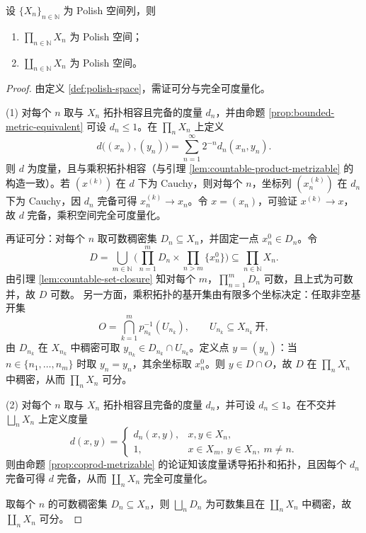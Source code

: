 \documentclass[lang=cn,a4paper,newtx,figureplace=section,tableplace=section]{elegantbook}
\begin{document}
\begin{theorem}\label{thm:polish-product-sum}
  设 $\{X_n\}_{n\in\mathbb N}$ 为 Polish 空间列，则
  \begin{enumerate}
    \item $\prod_{n\in\mathbb N}X_n$ 为 Polish 空间；
    \item $\coprod_{n\in\mathbb N}X_n$ 为 Polish 空间。
  \end{enumerate}
\end{theorem}
\begin{proof}
  由定义 \ref{def:polish-space}，需证可分与完全可度量化。

  (1) 对每个 $n$ 取与 $X_n$ 拓扑相容且完备的度量 $d_n$，并由命题 \ref{prop:bounded-metric-equivalent} 可设 $d_n\le 1$。在 $\prod_n X_n$ 上定义
  \[
    d\big((x_n),(y_n)\big)=\sum_{n=1}^{\infty}2^{-n}d_n(x_n,y_n).
  \]
  则 $d$ 为度量，且与乘积拓扑相容（与引理 \ref{lem:countable-product-metrizable} 的构造一致）。若 $(x^{(k)})$ 在 $d$ 下为 Cauchy，则对每个 $n$，坐标列 $(x^{(k)}_n)$ 在 $d_n$ 下为 Cauchy，因 $d_n$ 完备可得 $x^{(k)}_n\to x_n$。令 $x=(x_n)$，可验证 $x^{(k)}\to x$，故 $d$ 完备，乘积空间完全可度量化。

  再证可分：对每个 $n$ 取可数稠密集 $D_n\subseteq X_n$，并固定一点 $x_n^0\in D_n$。令
  \[
    D=\bigcup_{m\in\mathbb N}\Big(\prod_{n=1}^{m}D_n\times\prod_{n>m}\{x_n^0\}\Big)\subseteq\prod_{n\in\mathbb N}X_n.
  \]
  由引理 \ref{lem:countable-set-closure} 知对每个 $m$，$\prod_{n=1}^{m}D_n$ 可数，且上式为可数并，故 $D$ 可数。
  另一方面，乘积拓扑的基开集由有限多个坐标决定：任取非空基开集
  \[
    O=\bigcap_{k=1}^{m}p_{n_k}^{-1}(U_{n_k}),\qquad U_{n_k}\subseteq X_{n_k}\ \text{开},
  \]
  由 $D_{n_k}$ 在 $X_{n_k}$ 中稠密可取 $y_{n_k}\in D_{n_k}\cap U_{n_k}$。定义点 $y=(y_n)$：当 $n\in\{n_1,\dots,n_m\}$ 时取 $y_n=y_{n}$，其余坐标取 $x_n^0$。则 $y\in D\cap O$，故 $D$ 在 $\prod_n X_n$ 中稠密，从而 $\prod_n X_n$ 可分。

  (2) 对每个 $n$ 取与 $X_n$ 拓扑相容且完备的度量 $d_n$，并可设 $d_n\le 1$。在不交并 $\bigsqcup_n X_n$ 上定义度量
  \[
    d(x,y)=\begin{cases}
      d_n(x,y), & x,y\in X_n,\\
      1, & x\in X_m,\ y\in X_n,\ m\ne n.
    \end{cases}
  \]
  则由命题 \ref{prop:coprod-metrizable} 的论证知该度量诱导拓扑和拓扑，且因每个 $d_n$ 完备可得 $d$ 完备，从而 $\coprod_n X_n$ 完全可度量化。

  取每个 $n$ 的可数稠密集 $D_n\subseteq X_n$，则 $\bigsqcup_n D_n$ 为可数集且在 $\coprod_n X_n$ 中稠密，故 $\coprod_n X_n$ 可分。
\end{proof}
\end{document}
